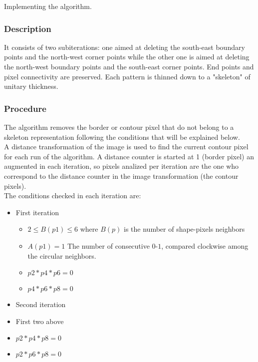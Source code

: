 \documentclass{article}
\begin{document}
Implementing the algorithm.\\

\subsubsection*{Description}
It consists of two subiterations: one aimed at
deleting the south-east boundary points and the north-west
corner points while the other one is aimed at deleting the
north-west boundary points and the south-east corner
points. End points and pixel connectivity are preserved.
Each pattern is thinned down to a "skeleton" of unitary
thickness.\\

\subsubsection*{Procedure}
The algorithm removes the border or contour pixel that do not belong to 
a skeleton representation following the conditions that will be explained
below. \\
A distance transformation of the image is used to find the current
contour pixel for each run of the algorithm. A distance counter is started
at 1 (border pixel) an augmented in each iteration, so pixels 
analized per iteration are the one who correspond to the distance counter
in the image transformation (the contour pixels).\\

The conditions checked in each iteration are:
\begin{itemize}
\item First iteration
  \begin{itemize}
  \item $2 \leq B(p1) \leq 6$ where $B(p)$ is the number of shape-pixels
    neighbors
  \item $A(p1) = 1$ The number of consecutive $0$-$1$, compared clockwise
    among the circular neighbors.
  \item $p2*p4*p6 = 0$
  \item $p4*p6*p8 = 0$
  \end{itemize}
\item Second iteration
  \item First two above
  \item $p2*p4*p8 = 0$
  \item $p2*p6*p8 = 0$
  \end{itemize}
\end{document}
